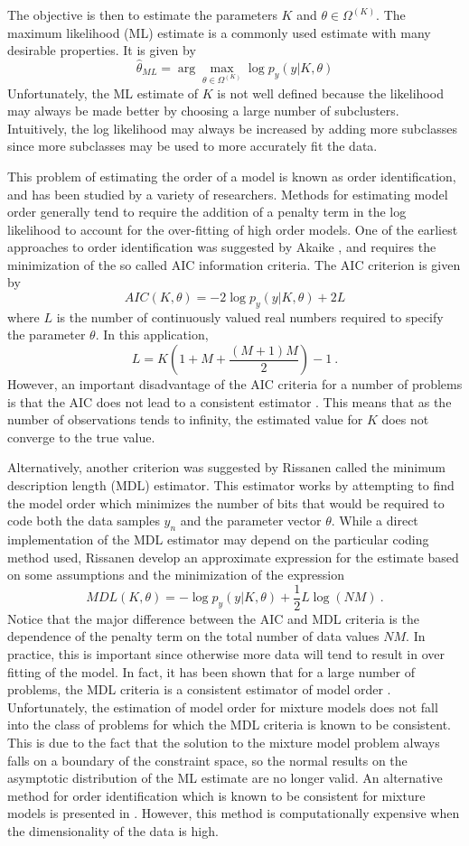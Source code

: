 \documentclass[12pt]{article}
\begin{document}
The objective is then to estimate the parameters
$K$ and $\theta \in \Omega^{(K)}$.
The maximum likelihood (ML) estimate is a commonly
used estimate with many desirable properties.
It is given by
$$
\hat{\theta}_{ML} = \arg \max_{\theta\in \Omega^{(K)}} \log p_y( y |K,\theta )
$$
Unfortunately, the ML estimate of $K$ is not well defined
because the likelihood may always be made better by choosing
a large number of subclusters.
Intuitively, the log likelihood may always be increased
by adding more subclasses since more subclasses may be
used to more accurately fit the data.

This problem of estimating the order of a model 
is known as order identification, and has been
studied by a variety of researchers.
Methods for estimating model order generally tend to require the addition
of a penalty term in the log likelihood to account
for the over-fitting of high order models.
One of the earliest approaches to order identification
was suggested by Akaike \cite{AK74},
and requires the minimization of the so called AIC
information criteria.
The AIC criterion is given by
$$
AIC(K,\theta) = -2\log p_y( y |K,\theta ) +2 L
$$
where $L$ is the number of continuously
valued real numbers required to specify the parameter $\theta$.
In this application,
$$
L =  K\left(1 + M + \frac{(M+1)M}{2}\right) - 1 \ .
$$
However, an important disadvantage of the AIC criteria
for a number of problems is that the AIC does not
lead to a consistent estimator \cite{Ka80}.
This means that as the number of observations tends to infinity,
the estimated value for $K$ does not converge to the true
value. 

Alternatively, another criterion was suggested by Rissanen \cite{Ri83}
called the minimum description length (MDL) estimator.
This estimator works by attempting to find the model order
which minimizes the number of bits that would be required to code
both the data samples $y_n$ and the parameter vector $\theta$.
While a direct implementation of the MDL estimator may depend on the
particular coding method used, Rissanen develop an approximate expression
for the estimate based on some assumptions and the minimization
of the expression
$$
MDL(K,\theta) = -\log p_y( y |K,\theta ) +\frac{1}{2} L \log (NM) \ .
$$
Notice that the major difference between the AIC and MDL criteria
is the dependence of the penalty term on the 
total number of data values $NM$. 
In practice, this is important since otherwise more data will tend to result
in over fitting of the model.
In fact, it has been shown that for a large number
of problems, the MDL criteria is a consistent estimator of model order \cite{Ka82,WaKa85}.
Unfortunately, the estimation of model order for mixture models
does not fall into the class of problems for which the MDL criteria
is known to be consistent.
This is due to the fact that the solution to the mixture model problem
always falls on a boundary of the constraint space,
so the normal results on the asymptotic distribution of the ML estimate
are no longer valid.
An alternative method for order identification which is known to be consistent
for mixture models is presented in \cite{ReWa84}.
However, this method is  computationally expensive  
when the dimensionality of the data is high.
\end{document}
